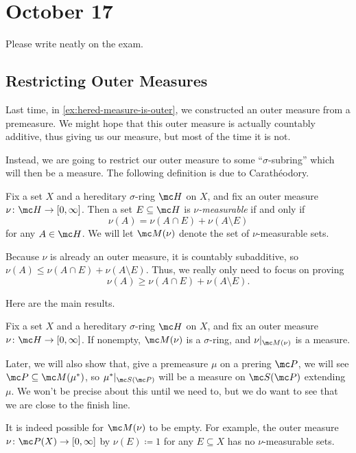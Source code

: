 \documentclass[../notes.tex]{subfiles}
\begin{document}
\section{October 17}

Please write neatly on the exam.

\subsection{Restricting Outer Measures}
Last time, in \autoref{ex:hered-measure-is-outer}, we constructed an outer measure from a premeasure. We might hope that this outer measure is actually countably additive, thus giving us our measure, but most of the time it is not.

Instead, we are going to restrict our outer measure to some ``$\sigma$-subring'' which will then be a measure. The following definition is due to Carath\'eodory.
\begin{definition}
	Fix a set $X$ and a hereditary $\sigma$-ring $\mc H$ on $X$, and fix an outer measure $\nu\colon\mc H\to[0,\infty]$. Then a set $E\subseteq\mc H$ is \textit{$\nu$-measurable} if and only if
	\[\nu(A)=\nu(A\cap E)+\nu(A\setminus E)\]
	for any $A\in\mc H$. We will let $\mc M(\nu)$ denote the set of $\nu$-measurable sets.
\end{definition}
\begin{remark} \label{rem:measurable-by-ineq}
	Because $\nu$ is already an outer measure, it is countably subadditive, so $\nu(A)\le\nu(A\cap E)+\nu(A\setminus E)$. Thus, we really only need to focus on proving
	\[\nu(A)\ge\nu(A\cap E)+\nu(A\setminus E).\]
\end{remark}
Here are the main results.
\begin{theorem} \label{thm:from-outer}
	Fix a set $X$ and a hereditary $\sigma$-ring $\mc H$ on $X$, and fix an outer measure $\nu\colon\mc H\to[0,\infty]$. If nonempty, $\mc M(\nu)$ is a $\sigma$-ring, and $\nu|_{\mc M(\nu)}$ is a measure.
\end{theorem}
\begin{remark}
	Later, we will also show that, give a premeasure $\mu$ on a prering $\mc P$, we will see $\mc P\subseteq\mc M(\mu^*)$, so $\mu^*|_{\mc S(\mc P)}$ will be a measure on $\mc S(\mc P)$ extending $\mu$. We won't be precise about this until we need to, but we do want to see that we are close to the finish line.
\end{remark}
\begin{remark}
	It is indeed possible for $\mc M(\nu)$ to be empty. For example, the outer measure $\nu\colon\mc P(X)\to[0,\infty]$ by $\nu(E)\coloneqq1$ for any $E\subseteq X$ has no $\nu$-measurable sets.
\end{remark}
\end{document}
